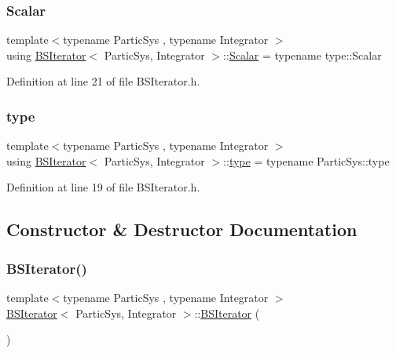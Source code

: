 \mbox{\label{class_b_s_iterator_a44773ad0f46d97005c8e21fa7c155c6f}} 
\subsubsection{\texorpdfstring{Scalar}{Scalar}}
{\footnotesize\ttfamily template$<$typename Partic\+Sys , typename Integrator $>$ \\
using \mbox{\hyperlink{class_b_s_iterator}{B\+S\+Iterator}}$<$ Partic\+Sys, Integrator $>$\+::\mbox{\hyperlink{class_b_s_iterator_a44773ad0f46d97005c8e21fa7c155c6f}{Scalar}} =  typename type\+::\+Scalar}



Definition at line 21 of file B\+S\+Iterator.\+h.

\mbox{\label{class_b_s_iterator_a19530085797de211565a566f581f20ca}} 
\subsubsection{\texorpdfstring{type}{type}}
{\footnotesize\ttfamily template$<$typename Partic\+Sys , typename Integrator $>$ \\
using \mbox{\hyperlink{class_b_s_iterator}{B\+S\+Iterator}}$<$ Partic\+Sys, Integrator $>$\+::\mbox{\hyperlink{class_b_s_iterator_a19530085797de211565a566f581f20ca}{type}} =  typename Partic\+Sys\+::type}



Definition at line 19 of file B\+S\+Iterator.\+h.



\subsection{Constructor \& Destructor Documentation}
\mbox{\label{class_b_s_iterator_a144fb5c55fcd7bc873e73f4d06276fb2}} 
\subsubsection{\texorpdfstring{B\+S\+Iterator()}{BSIterator()}}
{\footnotesize\ttfamily template$<$typename Partic\+Sys , typename Integrator $>$ \\
\mbox{\hyperlink{class_b_s_iterator}{B\+S\+Iterator}}$<$ Partic\+Sys, Integrator $>$\+::\mbox{\hyperlink{class_b_s_iterator}{B\+S\+Iterator}} (\begin{DoxyParamCaption}{ }\end{DoxyParamCaption})}



